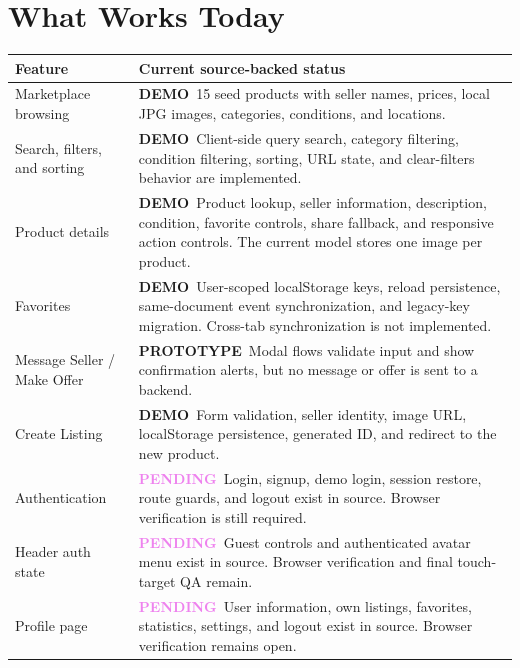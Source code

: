 \documentclass[10pt]{article}
\newcommand{\demo}{\textcolor{mint}{\textbf{DEMO}}}
\newcommand{\prototype}{\textcolor{warningtext}{\textbf{PROTOTYPE}}}
\newcommand{\pending}{\textcolor{violet}{\textbf{PENDING}}}
\begin{document}
\section{What Works Today}
\begin{tabular}{@{}p{4.2cm}p{9.4cm}@{}}
\toprule
\textbf{Feature} & \textbf{Current source-backed status} \\
\midrule
Marketplace browsing & \demo\ 15 seed products with seller names, prices, local JPG images, categories, conditions, and locations. \\
Search, filters, and sorting & \demo\ Client-side query search, category filtering, condition filtering, sorting, URL state, and clear-filters behavior are implemented. \\
Product details & \demo\ Product lookup, seller information, description, condition, favorite controls, share fallback, and responsive action controls. The current model stores one image per product. \\
Favorites & \demo\ User-scoped localStorage keys, reload persistence, same-document event synchronization, and legacy-key migration. Cross-tab synchronization is not implemented. \\
Message Seller / Make Offer & \prototype\ Modal flows validate input and show confirmation alerts, but no message or offer is sent to a backend. \\
Create Listing & \demo\ Form validation, seller identity, image URL, localStorage persistence, generated ID, and redirect to the new product. \\
Authentication & \pending\ Login, signup, demo login, session restore, route guards, and logout exist in source. Browser verification is still required. \\
Header auth state & \pending\ Guest controls and authenticated avatar menu exist in source. Browser verification and final touch-target QA remain. \\
Profile page & \pending\ User information, own listings, favorites, statistics, settings, and logout exist in source. Browser verification remains open. \\
\bottomrule
\end{tabular}
\end{document}
